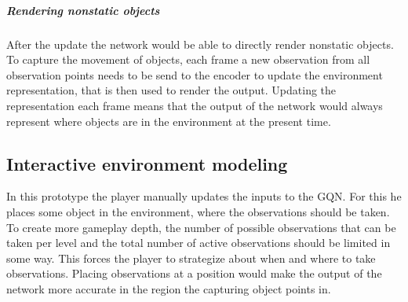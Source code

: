 \subparagraph{Rendering nonstatic objects}
After the update the network would be able to directly render nonstatic objects. To capture the movement of objects, each frame a new observation from all observation points needs to be send to the encoder to update the environment representation, that is then used to render the output. Updating the representation each frame means that the output of the network would always represent where objects are in the environment at the present time.


\subsection{Interactive environment modeling}\label{PlayerEnvironmentModeling}
In this prototype the player manually updates the inputs to the GQN. For this he places some object in the environment, where the observations should be taken. To create more gameplay depth, the number of possible observations that can be taken per level and the total number of active observations should be limited in some way. This forces the player to strategize about when and where to take observations. Placing observations at a position would make the output of the network more accurate in the region the capturing object points in.
